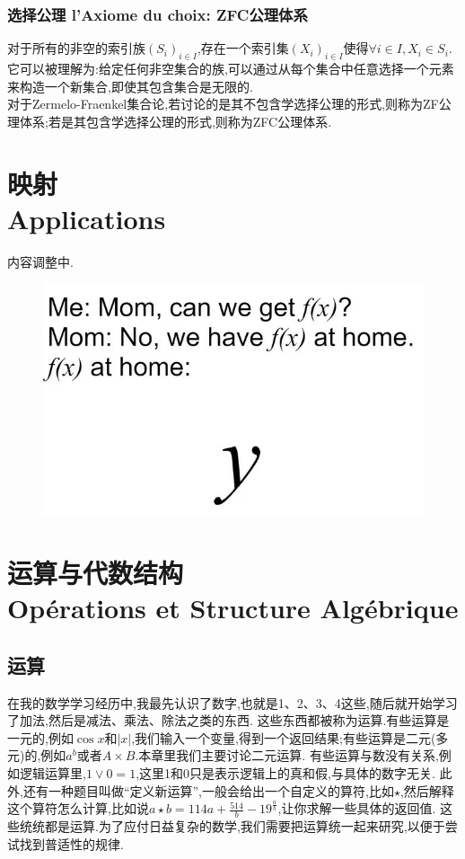 \documentclass[12pt, a4paper, oneside]{ctexbook}
\begin{document}
  \subsection{选择公理 l'Axiome du choix: ZFC公理体系}
  对于所有的非空的索引族$(S_i)_{i\in I}$,存在一个索引集$(X_i)_{i\in I}$使得$\forall i\in I,X_i\in S_i $.
  它可以被理解为:给定任何非空集合的族,可以通过从每个集合中任意选择一个元素来构造一个新集合,即使其包含集合是无限的.\\

  对于Zermelo-Fraenkel集合论,若讨论的是其不包含学选择公理的形式,则称为ZF公理体系;若是其包含学选择公理的形式,则称为ZFC公理体系.
  


\chapter{映射\\ Applications}%
内容调整中.
  \begin{figure}[H]
    \centering
    \includegraphics[scale=0.5]{yathome.jpg}
  \end{figure}


\chapter{运算与代数结构\\ Opérations et Structure Algébrique}
  
  \section{运算}
  在我的数学学习经历中,我最先认识了数字,也就是1、2、3、4这些,随后就开始学习了加法,然后是减法、乘法、除法之类的东西.
  这些东西都被称为运算.有些运算是一元的,例如$\cos x$和$|x|$,我们输入一个变量,得到一个返回结果;有些运算是二元(多元)的,例如$a^b$或者$A \times B$.本章里我们主要讨论二元运算.
  有些运算与数没有关系,例如逻辑运算里,$1\vee 0=1$,这里1和0只是表示逻辑上的真和假,与具体的数字无关.
  此外,还有一种题目叫做“定义新运算”,一般会给出一个自定义的算符,比如$\star $,然后解释这个算符怎么计算,比如说$a\star b=114a+\frac{514}{b}-19^{\frac{a}{b}}$,让你求解一些具体的返回值.
  这些统统都是运算.为了应付日益复杂的数学,我们需要把运算统一起来研究,以便于尝试找到普适性的规律.\label{myref:traditionalcalculate}
\end{document}
